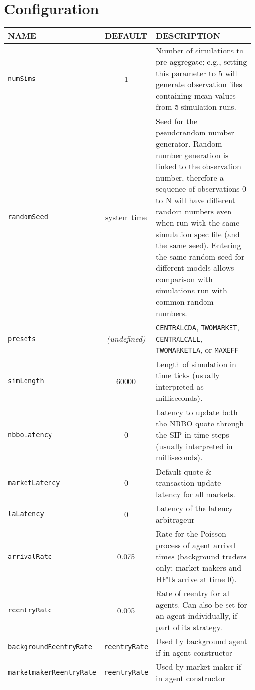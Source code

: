 \documentclass[11pt]{article}
\begin{document}
\section{Configuration}

\begin{table}
\centering
\begin{tabular}[f]{p{} c p{}}
\uppercase{Name}   & \uppercase{Default} & \uppercase{Description} \\ \hline

\texttt{numSims} 		& 1 & Number of simulations to pre-aggregate; e.g., setting this parameter to 5 will generate observation files containing mean values from 5 simulation runs. \\
\texttt{randomSeed} 	& system time & Seed for the pseudorandom number generator. Random number generation is linked to the observation number, therefore a sequence of observations 0 to N will have different random numbers even when run with the same simulation spec file (and the same seed). Entering the same random seed for different models allows comparison with simulations run with common random numbers. \\
\texttt{presets}  		& \emph{(undefined)} & \texttt{CENTRALCDA},
\texttt{TWOMARKET}, \texttt{CENTRALCALL}, \texttt{TWOMARKETLA}, or \texttt{MAXEFF} \\

\texttt{simLength} 	& 60000 & Length of simulation in time ticks (usually interpreted as milliseconds). \\ 
\texttt{nbboLatency} 	& 0 & Latency to update both the NBBO quote through the SIP in time steps (usually interpreted in milliseconds).\\
\texttt{marketLatency} 	& 0 & Default quote \& transaction update latency for
all markets. \\
\texttt{laLatency} 	& 0 & Latency of the latency arbitrageur \\


\texttt{arrivalRate} 	& 0.075 & Rate for the Poisson process of agent arrival times (background traders only; market makers and HFTs arrive at time 0). \\
\texttt{reentryRate} 	& 0.005 & Rate of reentry for all agents. Can also be set for an agent individually, if part of its strategy.\\
\texttt{backgroundReentryRate} & \texttt{reentryRate} & Used by background agent if in agent constructor \\
\texttt{marketmakerReentryRate} & \texttt{reentryRate} & Used by market maker if in agent constructor \\


\end{tabular}
\end{table}
\end{document}

